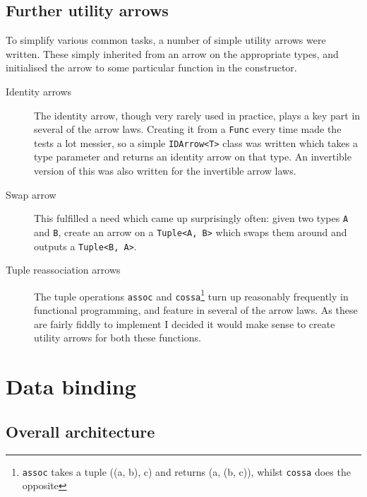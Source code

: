 \documentclass[12pt,twoside,notitlepage]{report}
\begin{document}
\subsection{Further utility arrows} \label{sec:further_utility_arrows}

To simplify various common tasks, a number of simple utility arrows were written. These simply inherited from an arrow on the appropriate types, and initialised the arrow to some particular function in the constructor.

\begin{description}
	\item[Identity arrows] The identity arrow, though very rarely used in practice, plays a key part in several of the arrow laws. Creating it from a \texttt{Func} every time made the tests a lot messier, so a simple \texttt{IDArrow<T>} class was written which takes a type parameter and returns an identity arrow on that type. An invertible version of this was also written for the invertible arrow laws.
	\item[Swap arrow] This fulfilled a need which came up surprisingly often: given two types \texttt{A} and \texttt{B}, create an arrow on a \texttt{Tuple<A, B>} which swaps them around and outputs a \texttt{Tuple<B, A>}.
	\item[Tuple reassociation arrows] The tuple operations \texttt{assoc} and \texttt{cossa}\footnote{\texttt{assoc} takes a tuple ((a, b), c) and returns (a, (b, c)), whilst \texttt{cossa} does the opposite} turn up reasonably frequently in functional programming, and feature in several of the arrow laws. As these are fairly fiddly to implement I decided it would make sense to create utility arrows for both these functions.
\end{description}




\section{Data binding}

\subsection{Overall architecture}
\end{document}
